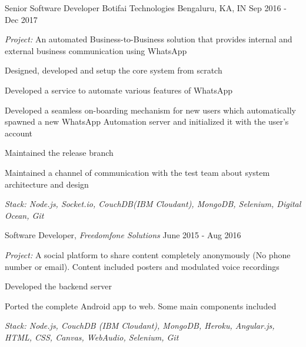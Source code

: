 \begin{cventries}
    \cventry
    {Senior Software Developer} %
    {Botifai Technologies} %
    {Bengaluru, KA, IN} %
    {Sep 2016 - Dec 2017} %
    {
        \begin{cvitems} %
            \item {\textit{Project: }An automated Business-to-Business solution that provides internal and external business communication using WhatsApp}
            \item {Designed, developed and setup the core system from scratch}
            \item {Developed a service to automate various features of WhatsApp}
            \item {Developed a seamless on-boarding mechanism for new users which automatically spawned a new WhatsApp Automation server and initialized it with the user's account}
            \item {Maintained the release branch}
            \item {Maintained a channel of communication with the test team about system architecture and design}
            \item \textit{Stack: Node.js, Socket.io, CouchDB(IBM Cloudant), MongoDB, Selenium, Digital Ocean, Git}
        \end{cvitems}
    }

    \cventry
    {Software Developer, \textit{Freedomfone Solutions}} %
    {} %
    {} %
    {June 2015 - Aug 2016} %
    {
        \begin{cvitems}
            \item {\textit{Project: }A social platform to share content completely anonymously (No phone number or email). Content included posters and modulated voice recordings}
            \item {Developed the backend server}
            \item {Ported the complete Android app to web. Some main components included}
            \item \textit{Stack: Node.js, CouchDB (IBM Cloudant), MongoDB, Heroku, Angular.js, HTML, CSS, Canvas, WebAudio, Selenium, Git}
        \end{cvitems}
    }
\end{cventries}
